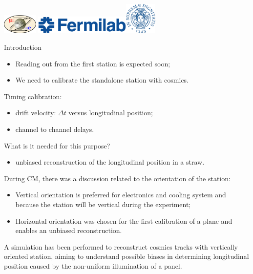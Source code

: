 \documentclass{beamer}[10pt]
\begin{document}
\begin{frame}
\centering
\includegraphics[height=1cm]{figures/png/mu2e_logo_oval.png}
\titlepage
\centering
\includegraphics[height=0.9cm]{figures/png/FNAL-Logo-NAL-Blue.png}\hspace{10mm}\includegraphics[height=1.6cm]{figures/pdf/cherubino.pdf}

\end{frame}
\begin{frame}{Introduction}
  \begin{itemize}
  \item Reading out from the first station is expected soon;
  \item We need to calibrate the standalone station with cosmics.
  \end{itemize}
  \vspace{1.5mm}
 Timing calibration:
  \begin{itemize}
    \item drift velocity: $\Delta t$ versus longitudinal position;
    \item channel to channel delays.
  \end{itemize}
  \vspace{1.5mm}
  What is it needed for this purpose?
  \begin{itemize}
    \item unbiased reconstruction of the longitudinal position in a straw.
  \end{itemize}
  \vspace{1.5mm}
  During CM, there was a discussion related to the orientation of the station:
  \begin{itemize}
    \item Vertical orientation is preferred for electronics and cooling system and because the station will be vertical during the experiment;
  \item Horizontal orientation was chosen for the first calibration of a plane and enables an unbiased reconstruction.
\end{itemize}
\vspace{1.5mm}
  A simulation has been performed to reconstruct cosmics tracks with vertically oriented station,
  aiming to understand possible biases in determining longitudinal position caused by the non-uniform illumination of a panel.
\end{frame}
\end{document}
